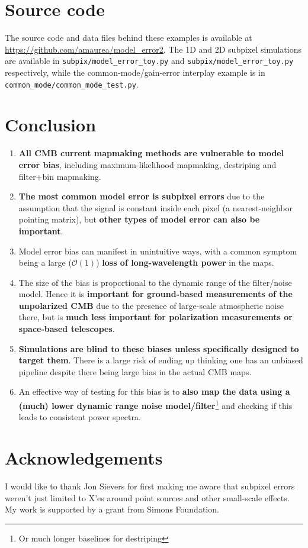 \documentclass[twocolumn,apj]{aastex63}
\begin{document}
\section{Source code}
\label{sec:code}
The source code and data files behind these examples is available at
\url{https://github.com/amaurea/model_error2}. The 1D and 2D subpixel
simulations are available in \verb|subpix/model_error_toy.py| and \verb|subpix/model_error_toy.py|
respectively, while the common-mode/gain-error interplay example is in
\verb|common_mode/common_mode_test.py|.

\section{Conclusion}

\begin{enumerate}
	\item \textbf{All CMB current mapmaking methods are vulnerable to model error bias},
		including maximum-likelihood mapmaking, destriping and filter+bin mapmaking.
	\item \textbf{The most common model error is subpixel errors} due to the assumption that
		the signal is constant inside each pixel (a nearest-neighbor pointing matrix),
		but \textbf{other types of model error can also be important}.
	\item Model error bias can manifest in unintuitive ways, with a common symptom
		being a large ($\mathcal{O}(1)$) \textbf{loss of long-wavelength power} in the maps.
	\item The size of the bias is proportional to the dynamic range of the filter/noise model.
		Hence it is \textbf{important for ground-based measurements of the unpolarized CMB}
		due to the presence of large-scale atmospheric noise there, but is \textbf{much less
		important for polarization measurements or space-based telescopes}.
	\item \textbf{Simulations are blind to these biases unless specifically designed to
		target them}. There is a large risk of ending up thinking one has an unbiased
		pipeline despite there being large bias in the actual CMB maps.
	\item An effective way of testing for this bias is to \textbf{also map the data using a
		(much) lower dynamic range noise model/filter}\footnote{Or much longer baselines for destriping}
		and checking if this leads to consistent power spectra.
\end{enumerate}

\section*{Acknowledgements}
I would like to thank Jon Sievers for first making me aware
that subpixel errors weren't just limited to X'es around point
sources and other small-scale effects.
My work is supported by a grant from Simons Foundation.



\end{document}
